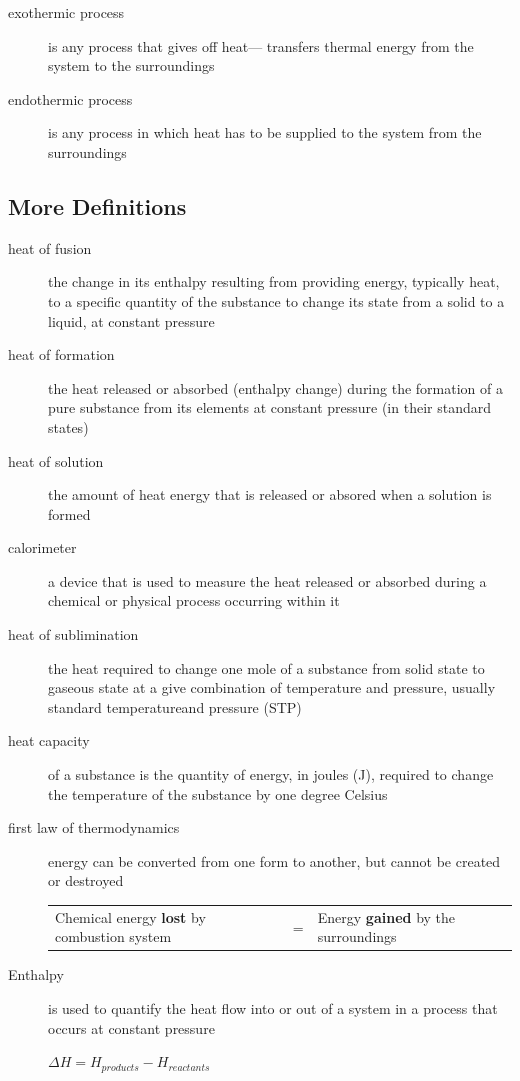 \documentclass[11pt]{article}
\begin{document}
    \begin{description}
        \item[exothermic process]
        is any process that gives off heat--- transfers thermal energy from the system to the surroundings
        \item[endothermic process] is any process in which heat has to be supplied to the system from the surroundings
    \end{description}

    \subsection{More Definitions}

    \begin{description}
        \item[heat of fusion]
        the change in its enthalpy resulting from providing energy, typically heat, to a specific quantity of the substance to change its state from a solid to a liquid, at constant pressure
        \item[heat of formation]
        the heat released or absorbed (enthalpy change) during the formation of a pure substance from its elements at constant pressure (in their standard states)
        \item[heat of solution]
        the amount of heat energy that is released or absored when a solution is formed
        \item[calorimeter]
        a device that is used to measure the heat released or absorbed during a chemical or physical process occurring within it
        \item[heat of sublimination]
        the heat required to change one mole of a substance from solid  state to gaseous state at a give combination of temperature and pressure, usually standard temperatureand pressure (STP)
        \item[heat capacity]
        of a substance is the quantity of energy, in joules (J), required to change the temperature of the substance by one degree Celsius
        \item[first law of thermodynamics]
        energy can be converted from one form to another, but cannot be created or destroyed \\
        
        \begin{tabular}{ p{5cm} p{0.5cm} p{5cm} }
        Chemical energy \textbf{lost}  by combustion system & = & Energy \textbf{gained}  by the surroundings
        \end{tabular}

        \item[Enthalpy]
        is used to quantify the heat flow into or out of a system in a process that occurs at constant pressure

        \begin{center}
        $\Delta H = H_{products} - H_{reactants}$
        \end{center}

    \end{description}
\end{document}
